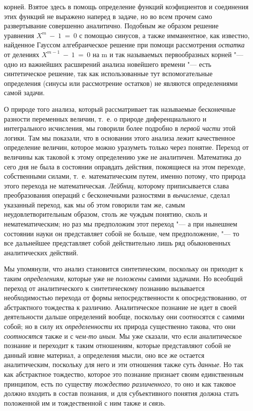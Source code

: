корней. Взятое здесь в помощь определение функций коэфициентов и соединения
этих функций не выражено наперед в задаче, но во всем прочем само
развертывание совершенно аналитично. Подобным же образом
решение уравнения $X^m~-~1~=~0$
с помощью синусов, а также имманентное, как известно,
найденное
Гауссом
алгебраическое решение при помощи рассмотрения
{\em остатка} от делениях $X^{m-1}~-~1~=~0$ на m и так называемых
первообразных корней
"--- одно из важнейших расширений анализа новейшего времени
"--- есть синтетическое решение, так как использованные тут
вспомогательные определения (синусы или рассмотрение остатков) не являются
определениями самой задачи.

О природе того анализа, который рассматривает так называемые
бесконечные разности переменных величин, т.~е. о природе диференциального и
интегрального исчисления, мы говорили более подробно в
{\em первой части} этой
логики. Там мы показали, что в основании этого анализа лежит качественное
определение величин, которое можно уразуметь только через понятие. Переход
от величины как таковой к этому определению уже не аналитичен. Математика
до сего дня не была в состоянии оправдать действия, покоящиеся на этом
переходе, собственными силами, т.~е. математическим путем, именно потому,
что природа этого перехода не математическая.
{\em Лейбниц}, которому
приписывается слава преобразования операций с бесконечными разностями в
{\em вычисление}, сделал
указанный переход, как мы об этом говорили там же, самым
неудовлетворительным образом, столь же чуждым понятию, сколь и
нематематическим; но раз мы предположим этот переход "--- а при
нынешнем состоянии науки он представляет собой не больше, чем
предположение, "--- то все дальнейшее представляет собой
действительно лишь ряд обыкновенных аналитических действий.

Мы упомянули, что анализ становится синтетическим, поскольку
он приходит к таким {\em определениям},
которые уже не
{\em положены} самими
задачами. Но всеобщий переход от аналитического к синтетическому познанию
вызывается необходимостью перехода от формы непосредственности к
опосредствованию, от абстрактного тождества к различию. Аналитическое
познание не идет в своей деятельности дальше определений вообще, поскольку
они соотносятся с самими собой; но в силу их
{\em определенности} их
природа существенно такова, что они
{\em соотносятся} также и
с {\em чем-то иным}.
Мы уже сказали, что если аналитическое познание и переходит к
таким отношениям, которые представляют собой не данный извне материал, а
определения мысли, оно все же остается аналитическим, поскольку для него и
эти отношения также суть {\em данные}.
Но так как абстрактное тождество, которое это познание
признает своим единственным принципом, есть по существу
{\em тождество различенного},
то оно и как таковое должно входить в состав
познания, и для субъективного понятия должна стать положенной им и
тождественной с ним также и
{\em связь}.

